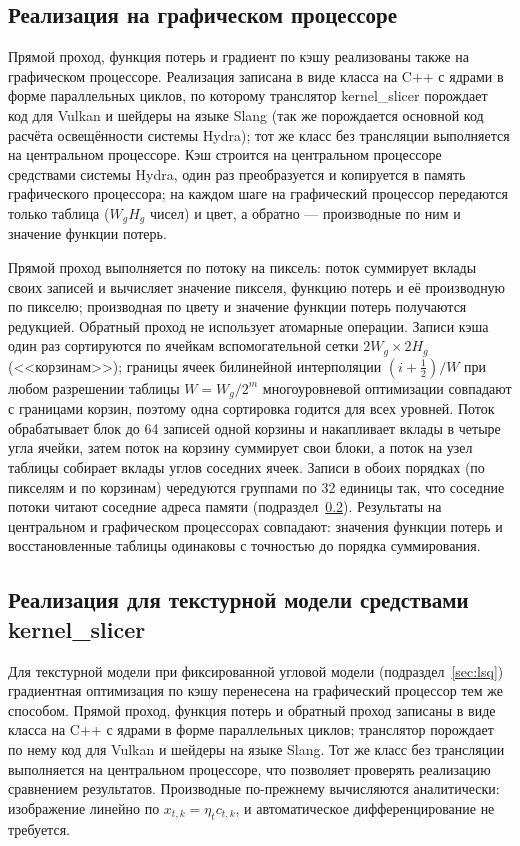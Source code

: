 \subsection{Реализация на графическом процессоре}
\label{sec:ies-gpu}

Прямой проход, функция потерь и градиент по кэшу реализованы также на графическом процессоре. Реализация записана в виде класса на C++ с ядрами в форме параллельных циклов, по которому транслятор kernel\_slicer порождает код для Vulkan и шейдеры на языке Slang (так же порождается основной код расчёта освещённости системы Hydra); тот же класс без трансляции выполняется на центральном процессоре. Кэш строится на центральном процессоре средствами системы Hydra, один раз преобразуется и копируется в память графического процессора; на каждом шаге на графический процессор передаются только таблица ($W_gH_g$ чисел) и цвет, а обратно --- производные по ним и значение функции потерь.

Прямой проход выполняется по потоку на пиксель: поток суммирует вклады своих записей и вычисляет значение пикселя, функцию потерь и её производную по пикселю; производная по цвету и значение функции потерь получаются редукцией. Обратный проход не использует атомарные операции. Записи кэша один раз сортируются по ячейкам вспомогательной сетки $2W_g\times2H_g$ (<<корзинам>>); границы ячеек билинейной интерполяции $(i+\tfrac12)/W$ при любом разрешении таблицы $W=W_g/2^m$ многоуровневой оптимизации совпадают с границами корзин, поэтому одна сортировка годится для всех уровней. Поток обрабатывает блок до 64 записей одной корзины и накапливает вклады в четыре угла ячейки, затем поток на корзину суммирует свои блоки, а поток на узел таблицы собирает вклады углов соседних ячеек. Записи в обоих порядках (по пикселям и по корзинам) чередуются группами по 32 единицы так, что соседние потоки читают соседние адреса памяти (подраздел~\ref{sec:tex5-gpu}). Результаты на центральном и графическом процессорах совпадают: значения функции потерь и восстановленные таблицы одинаковы с точностью до порядка суммирования.

\subsection{Реализация для текстурной модели средствами kernel\_slicer}
\label{sec:tex5-gpu}

Для текстурной модели при фиксированной угловой модели (подраздел~\ref{sec:lsq}) градиентная оптимизация по кэшу перенесена на графический процессор тем же способом. Прямой проход, функция потерь и обратный проход записаны в виде класса на C++ с ядрами в форме параллельных циклов; транслятор порождает по нему код для Vulkan и шейдеры на языке Slang. Тот же класс без трансляции выполняется на центральном процессоре, что позволяет проверять реализацию сравнением результатов. Производные по-прежнему вычисляются аналитически: изображение линейно по $x_{t,k}=\eta_tc_{t,k}$, и автоматическое дифференцирование не требуется.

